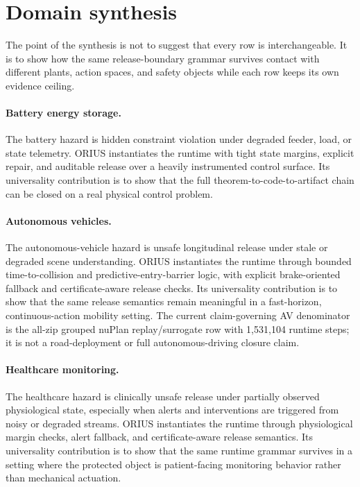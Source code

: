 \section{Domain synthesis}
The point of the synthesis is not to suggest that every row is interchangeable. It is to
show how the same release-boundary grammar survives contact with different plants, action
spaces, and safety objects while each row keeps its own evidence ceiling.

\paragraph{Battery energy storage.}
The battery hazard is hidden constraint violation under degraded feeder, load, or state
telemetry. ORIUS instantiates the runtime with tight state margins, explicit repair, and
auditable release over a heavily instrumented control surface. Its universality contribution
is to show that the full theorem-to-code-to-artifact chain can be closed on a real physical
control problem.

\paragraph{Autonomous vehicles.}
The autonomous-vehicle hazard is unsafe longitudinal release under stale or degraded scene
understanding. ORIUS instantiates the runtime through bounded time-to-collision and
predictive-entry-barrier logic, with explicit brake-oriented fallback and certificate-aware
release checks. Its universality contribution is to show that the same release semantics
remain meaningful in a fast-horizon, continuous-action mobility setting.
The current claim-governing AV denominator is the all-zip grouped nuPlan
replay/surrogate row with 1{,}531{,}104 runtime steps; it is not a road-deployment
or full autonomous-driving closure claim.

\paragraph{Healthcare monitoring.}
The healthcare hazard is clinically unsafe release under partially observed physiological
state, especially when alerts and interventions are triggered from noisy or degraded
streams. ORIUS instantiates the runtime through physiological margin checks, alert fallback,
and certificate-aware release semantics. Its universality contribution is to show that the
same runtime grammar survives in a setting where the protected object is patient-facing
monitoring behavior rather than mechanical actuation.

